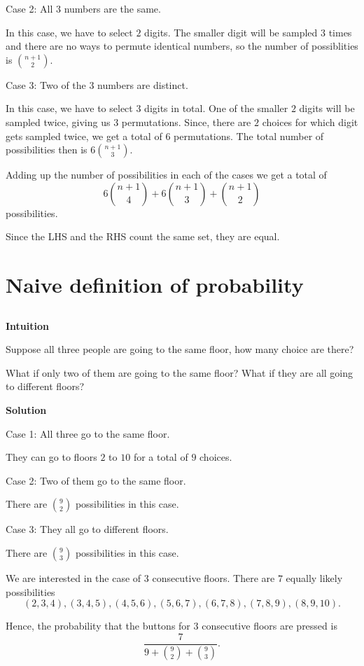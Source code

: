 \documentclass[]{book}
\begin{document}
Case 2: All \(3\) numbers are the same.

In this case, we have to select \(2\) digits. The smaller digit will be
sampled \(3\) times and there are no ways to permute identical numbers,
so the number of possiblities is \({n+1 \choose 2}\).

Case 3: Two of the \(3\) numbers are distinct.

In this case, we have to select \(3\) digits in total. One of the
smaller \(2\) digits will be sampled twice, giving us \(3\)
permutations. Since, there are \(2\) choices for which digit gets
sampled twice, we get a total of \(6\) permutations. The total number of
possibilities then is \(6{n+1 \choose 3}\).

Adding up the number of possibilities in each of the cases we get a
total of \[6{n+1 \choose 4} + 6{n+1 \choose 3} + {n+1 \choose 2}\]
possibilities.

Since the LHS and the RHS count the same set, they are equal.

\section{Naive definition of
probability}\label{naive-definition-of-probability}

\subsection{}\label{section-22}

\textbf{Intuition}

Suppose all three people are going to the same floor, how many choice
are there?

What if only two of them are going to the same floor? What if they are
all going to different floors?

\textbf{Solution}

Case 1: All three go to the same floor.

They can go to floors \(2\) to \(10\) for a total of \(9\) choices.

Case 2: Two of them go to the same floor.

There are \(9 \choose 2\) possibilities in this case.

Case 3: They all go to different floors.

There are \(9 \choose 3\) possibilities in this case.

We are interested in the case of \(3\) consecutive floors. There are
\(7\) equally likely possibilities
\[(2, 3, 4), (3, 4, 5), (4, 5, 6), (5, 6, 7), (6, 7, 8), (7, 8, 9), (8, 9, 10).\]

Hence, the probability that the buttons for \(3\) consecutive floors are
pressed is \[\frac{7}{9 + {9 \choose 2} + {9 \choose 3}}.\]


\end{document}
